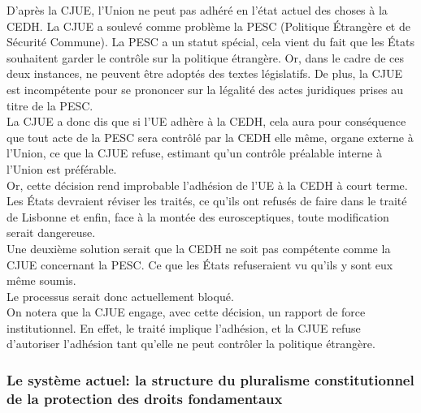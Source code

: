 \documentclass[12pt, a4paper, openany]{book}
\begin{document}
D'après la CJUE, l'Union ne peut pas adhéré en l'état actuel des choses à la CEDH. La CJUE a soulevé comme problème la PESC (Politique Étrangère et de Sécurité Commune). La PESC a un statut spécial, cela vient du fait que les États souhaitent garder le contrôle sur la politique étrangère. Or, dans le cadre de ces deux instances, ne peuvent être adoptés des textes législatifs. De plus, la CJUE est incompétente pour se prononcer sur la légalité des actes juridiques prises au titre de la PESC. \\
La CJUE a donc dis que si l'UE adhère à la CEDH, cela aura pour conséquence que tout acte de la PESC sera contrôlé par la CEDH elle même, organe externe à l'Union, ce que la CJUE refuse, estimant qu'un contrôle préalable interne à l'Union est préférable. \\
Or, cette décision rend improbable l'adhésion de l'UE à la CEDH à court terme. Les États devraient réviser les traités, ce qu'ils ont refusés de faire dans le traité de Lisbonne et enfin, face à la montée des eurosceptiques, toute modification serait dangereuse. \\
Une deuxième solution serait que la CEDH ne soit pas compétente comme la CJUE concernant la PESC. Ce que les États refuseraient vu qu'ils y sont eux même soumis. \\
Le processus serait donc actuellement bloqué. \\
On notera que la CJUE engage, avec cette décision, un rapport de force institutionnel. En effet, le traité implique l'adhésion, et la CJUE refuse d'autoriser l'adhésion tant qu'elle ne peut contrôler la politique étrangère. 

\subsubsection{Le système actuel: la structure du pluralisme constitutionnel de la protection des droits fondamentaux}
\end{document}
